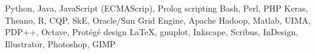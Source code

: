 
        {Python, Java, JavaScript (ECMA\-Scrip), Prolog}
    {scripting}
        {Bash, Perl, PHP}
        {Keras, Theano, R, CQP, SkE, Oracle/Sun Grid Engine, Apache Hadoop,
        Matlab, UIMA, PDP++, Octave, Prot\'{e}g\'{e}}
    {design}
        {\LaTeX, gnuplot, Inkscape, Scribus, InDesign, Illustrator, Photoshop, GIMP}

